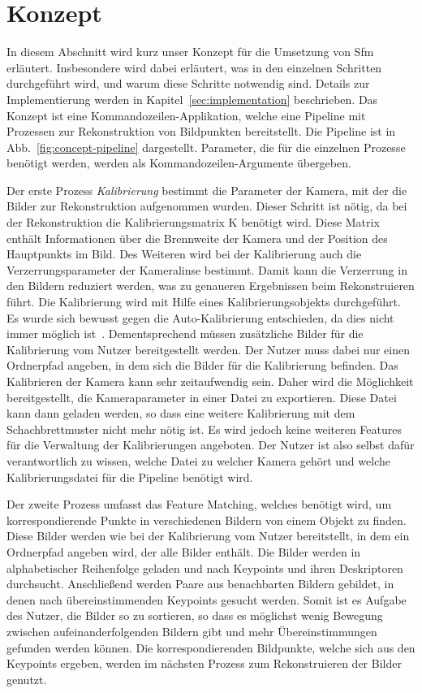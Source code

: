 
\chapter{Konzept}
In diesem Abschnitt wird kurz unser Konzept für die Umsetzung von Sfm erläutert. 
Insbesondere wird dabei erläutert, was in den einzelnen Schritten durchgeführt wird, und warum diese Schritte notwendig sind.
Details zur Implementierung werden in Kapitel~\ref{sec:implementation} beschrieben.
Das Konzept ist eine Kommandozeilen-Applikation, welche eine Pipeline mit Prozessen zur Rekonstruktion von Bildpunkten bereitstellt.
Die Pipeline ist in Abb.~\ref{fig:concept-pipeline} dargestellt.
Parameter, die für die einzelnen Prozesse benötigt werden, werden als Kommandozeilen-Argumente übergeben.

Der erste Prozess \emph{Kalibrierung} bestimmt die Parameter der Kamera, mit der die Bilder zur Rekonstruktion aufgenommen wurden.
Dieser Schritt ist nötig, da bei der Rekonstruktion die Kalibrierungsmatrix K benötigt wird.
Diese Matrix enthält Informationen über die Brennweite der Kamera und der Position des Hauptpunkts im Bild.
Des Weiteren wird bei der Kalibrierung auch die Verzerrungsparameter der Kameralinse bestimmt.
Damit kann die Verzerrung in den Bildern reduziert werden, was zu genaueren Ergebnissen beim Rekonstruieren führt.%
Die Kalibrierung wird mit Hilfe eines Kalibrierungsobjekts durchgeführt.
Es wurde sich bewusst gegen die Auto-Kalibrierung entschieden, da dies nicht immer möglich ist~\cite{remondino_2005}.
Dementsprechend müssen zusätzliche Bilder für die Kalibrierung vom Nutzer bereitgestellt werden.
Der Nutzer muss dabei nur einen Ordnerpfad angeben, in dem sich die Bilder für die Kalibrierung befinden.
Das Kalibrieren der Kamera kann sehr zeitaufwendig sein.
Daher wird die Möglichkeit bereitgestellt, die Kameraparameter in einer Datei zu exportieren.
Diese Datei kann dann geladen werden, so dass eine weitere Kalibrierung mit dem Schachbrettmuster nicht mehr nötig ist. 
Es wird jedoch keine weiteren Features für die Verwaltung der Kalibrierungen angeboten.
Der Nutzer ist also selbst dafür verantwortlich zu wissen, welche Datei zu welcher Kamera gehört und welche Kalibrierungsdatei für die Pipeline benötigt wird. 

Der zweite Prozess umfasst das Feature Matching, welches benötigt wird, um korrespondierende Punkte in verschiedenen Bildern von einem Objekt zu finden.
Diese Bilder werden wie bei der Kalibrierung vom Nutzer bereitstellt, in dem ein Ordnerpfad angeben wird, der alle Bilder enthält. 
Die Bilder werden in alphabetischer Reihenfolge geladen und nach Keypoints und ihren Deskriptoren durchsucht.
Anschließend werden Paare aus benachbarten Bildern gebildet, in denen nach übereinstimmenden Keypoints gesucht werden.
Somit ist es Aufgabe des Nutzer, die Bilder so zu sortieren, so dass es möglichst wenig Bewegung zwischen aufeinanderfolgenden Bildern gibt und mehr Übereinstimmungen gefunden werden können.
Die korrespondierenden Bildpunkte, welche sich aus den Keypoints ergeben, werden im nächsten Prozess zum Rekonstruieren der Bilder genutzt.  

